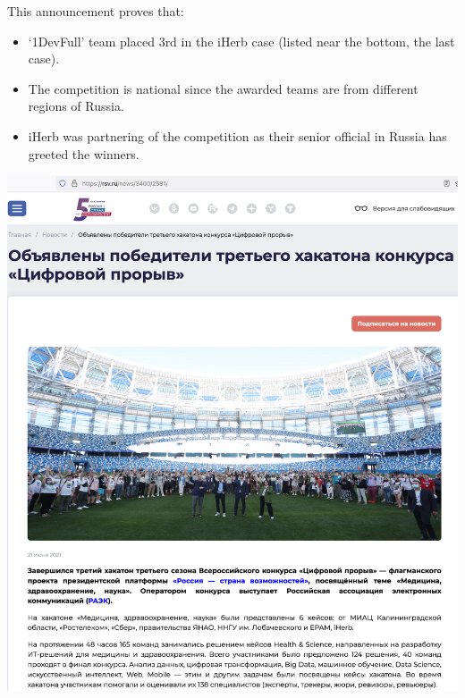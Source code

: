 
This announcement proves that:

\begin{itemize}
    \item `1DevFull' team placed 3rd in the iHerb case (listed near the bottom, the last case).
    \item The competition is national since the awarded teams are from different regions of Russia.
    \item iHerb was partnering of the competition as their senior official in Russia has greeted the winners.
\end{itemize}



\begin{center}
    \includegraphics[width=40em]{rsv-news-p1}
\end{center}
\WillContinue
\pagebreak

